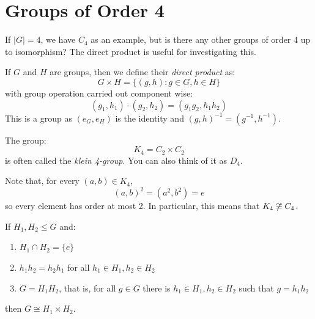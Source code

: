 \documentclass[../main.tex]{subfiles}
\begin{document}
\section{Groups of Order 4}
If $|G| = 4$, we have $C_4$ as an example, but is there any other groups of order 4 up to isomorphism?
The direct product is useful for investigating this.
\begin{definition}
  If $G$ and $H$ are groups, then we define their \textit{direct product} as:
  \[
    G \times H = \{(g, h) : g \in G, h \in H\}
  \]
  with group operation carried out component wise:
  \[
    (g_1, h_1) \cdot (g_2, h_2) = (g_1g_2, h_1h_2)
  \]
  This is a group as $(e_G, e_H)$ is the identity and $(g, h)^{-1} = (g^{-1}, h^{-1})$.
\end{definition}
\begin{example}
  The group:
  \[
    K_4 = C_2 \times C_2
  \]
  is often called the \textit{klein 4-group}.
  You can also think of it as $D_4$.

  Note that, for every $(a, b) \in K_4$,
  \[
    (a, b)^2 = (a^2, b^2) = e
  \]
  so every element has order at most 2.
  In particular, this means that $K_4 \centernot\cong C_4$.
\end{example}
\begin{theorem}
  If $H_1, H_2 \leq G$ and: \label{directProductTheorem}
  \begin{enumerate}
    \item $H_1 \cap H_2 = \{e\}$
    \item $h_1 h_2 = h_2 h_1$ for all $h_1 \in H_1, h_2 \in H_2$
    \item $G = H_1 H_2$, that is, for all $g \in G$ there is $h_1 \in H_1, h_2 \in H_2$ such that $g = h_1 h_2$
  \end{enumerate}
  then $G\cong H_1 \times H_2$.
\end{theorem}
\end{document}
